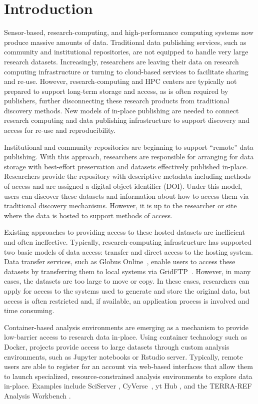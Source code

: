 \documentclass{sig-alternate}
\begin{document}
\section{Introduction}

Sensor-based, research-computing, and high-performance computing systems now produce massive amounts of data.  Traditional data publishing services, such as community and institutional repositories, are not equipped to handle very large research datasets.  Increasingly, researchers are leaving their data on research computing infrastructure or turning to cloud-based services to facilitate sharing and re-use. However, research-computing and HPC centers are typically not prepared to support long-term storage and access, as is often required by publishers, further disconnecting these research products from traditional discovery methods. New models of in-place publishing are needed to connect research computing and data publishing infrastructure to support discovery and access for re-use and reproducibility.

Institutional and community repositories are beginning to support ``remote'' data publishing.  With this approach, researchers are responsible for arranging for data storage with best-effort preservation and datasets effectively published in-place. Researchers provide the repository with descriptive metadata including methods of access and are assigned a digital object identifier (DOI).  Under this model, users can discover these datasets and information about how to access them via traditional discovery mechanisms. However, it is up to the researcher or site where the data is hosted to support methods of access.

Existing approaches to providing access to these hosted datasets are inefficient and often ineffective.  Typically, research-computing infrastructure has supported two basic models of data access: transfer and direct access to the hosting system.  Data transfer services, such as Globus Online~\cite{Foster11}, enable users to access these datasets by transferring them to local systems via GridFTP~\cite{Allcock05}.  However, in many cases, the datasets are too large to move or copy. In these cases, researchers can apply for access to the systems used to generate and store the original data, but access is often restricted and, if available, an application process is involved and time consuming.

Container-based analysis environments are emerging as a mechanism to provide low-barrier access to research data in-place.  Using container technology such as Docker, projects provide access to large datasets through custom analysis environments, such as Jupyter notebooks or Rstudio server.  Typically, remote users are able to register for an account via web-based interfaces that allow them to launch specialized, resource-constrained analysis environments to explore data in-place. Examples include SciServer \cite{Medvedev:2016:SCB:2949689.2949700}, CyVerse~\cite{Merchant16}, yt Hub \cite{zuhone2016galaxy}, and the TERRA-REF Analysis Workbench \cite{willis_craig_2017_580057}.
\end{document}
